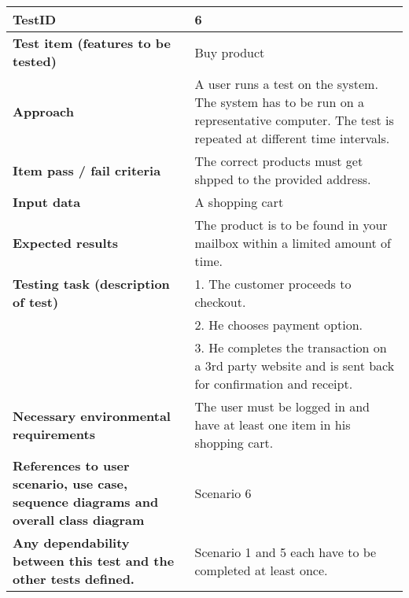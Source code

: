 \begin{table}
    \centering
	\begin{tabularx}{1.2\textwidth}{| p{5cm} | X |}
	\hline
	\textbf{TestID} 																& 6\\ \hline
	\textbf{Test item (features to be tested)} 											& Buy product\\ \hline
	\textbf{Approach} 															& A user runs a test on the system. The system has to be run on a representative computer. 
																			The test is repeated at different time intervals.\\ \hline
	\textbf{Item pass / fail criteria} 													& The correct products must get shpped to the provided address.\\ \hline
	\textbf{Input data} 															& A shopping cart\\ \hline
	\textbf{Expected results}									 					& The product is to be found in your mailbox within a limited amount of time.\\ \hline
	\textbf{Testing task (description of test)} 											& 1. The customer proceeds to checkout. \\
																			& 2. He chooses payment option. \\
																			& 3. He completes the transaction on a 3rd party website and is sent back for confirmation and receipt. \\ \hline
	\textbf{Necessary environmental requirements} 										& The user must be logged in and have at least one item in his shopping cart. \\ \hline
	\textbf{References to user scenario, use case, sequence diagrams and overall class diagram} 		& Scenario 6\\ \hline
	\textbf{Any dependability between this test and the other tests defined.}		 				& Scenario 1 and 5 each have to be completed at least once.\\ \hline
	\end{tabularx}
\end{table}
